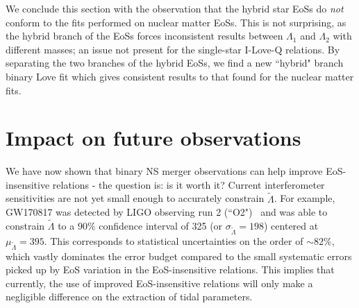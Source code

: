 \documentclass[prd,twocolumn,nofootinbib,superscriptaddress,amsmath,amssymb]{revtex4-1}
\begin{document}
We conclude this section with the observation that the hybrid star EoSs do \emph{not} conform to the fits performed on nuclear matter EoSs.
This is not surprising, as the hybrid branch of the EoSs forces inconsistent results between $\Lambda_1$ and $\Lambda_2$ with different masses; an issue not present for the single-star I-Love-Q relations.
By separating the two branches of the hybrid EoSs, we find a new ``hybrid" branch binary Love fit which gives consistent results to that found for the nuclear matter fits. 
{}
{}


\section{Impact on future observations}\label{sec:observations}

We have now shown that binary NS merger observations can help improve EoS-insensitive relations - the question is: is it worth it?
Current interferometer sensitivities are not yet small enough to accurately constrain $\tilde{\Lambda}$.
For example, GW170817 was detected by LIGO observing run 2 (``O2")~\cite{aLIGO} and was able to constrain $\tilde{\Lambda}$ to a $90\%$ confidence interval of 325 (or $\sigma_{\tilde{\Lambda}}=198$) centered at $\mu_{\tilde{\Lambda}}=395$.
This corresponds to statistical uncertainties on the order of $\sim 82\%$, which vastly dominates the error budget compared to the small systematic errors picked up by EoS variation in the EoS-insensitive relations.
This implies that currently, the use of improved EoS-insensitive relations will only make a negligible difference on the extraction of tidal parameters.
\end{document}
